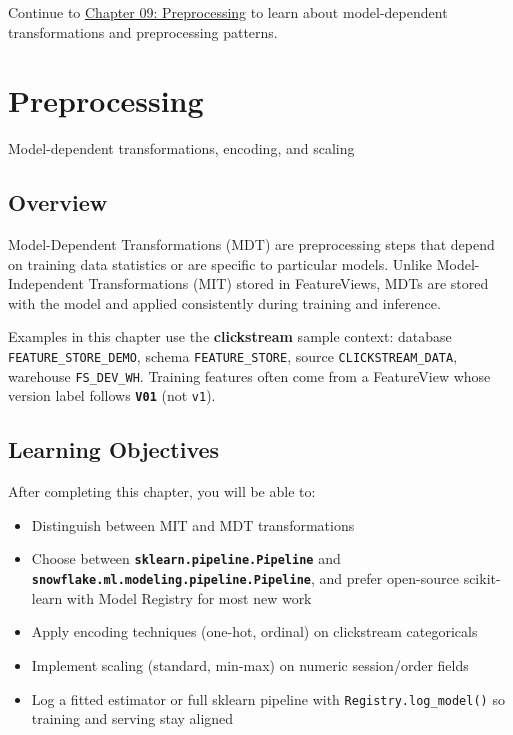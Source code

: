\documentclass[
  letterpaper,
  DIV=11,
  numbers=noendperiod]{scrreprt}
\providecommand{\tightlist}{%
  \setlength{\itemsep}{0pt}\setlength{\parskip}{0pt}}\usepackage{longtable,booktabs,array}
\begin{document}
Continue to \protect\hyperlink{preprocessing}{Chapter 09: Preprocessing}
to learn about model-dependent transformations and preprocessing
patterns.

\hypertarget{preprocessing}{%
\chapter{Preprocessing}\label{preprocessing}}

Model-dependent transformations, encoding, and scaling

\hfill\break

\hypertarget{overview-9}{%
\section{Overview}\label{overview-9}}

Model-Dependent Transformations (MDT) are preprocessing steps that
depend on training data statistics or are specific to particular models.
Unlike Model-Independent Transformations (MIT) stored in FeatureViews,
MDTs are stored with the model and applied consistently during training
and inference.

Examples in this chapter use the \textbf{clickstream} sample context:
database \texttt{FEATURE\_STORE\_DEMO}, schema \texttt{FEATURE\_STORE},
source \texttt{CLICKSTREAM\_DATA}, warehouse \texttt{FS\_DEV\_WH}.
Training features often come from a FeatureView whose version label
follows \textbf{\texttt{V01}} (not \texttt{v1}).

\hypertarget{learning-objectives-8}{%
\section{Learning Objectives}\label{learning-objectives-8}}

After completing this chapter, you will be able to:

\begin{itemize}
\tightlist
\item
  Distinguish between MIT and MDT transformations
\item
  Choose between \textbf{\texttt{sklearn.pipeline.Pipeline}} and
  \textbf{\texttt{snowflake.ml.modeling.pipeline.Pipeline}}, and prefer
  open-source scikit-learn with Model Registry for most new work
\item
  Apply encoding techniques (one-hot, ordinal) on clickstream
  categoricals
\item
  Implement scaling (standard, min-max) on numeric session/order fields
\item
  Log a fitted estimator or full sklearn pipeline with
  \texttt{Registry.log\_model()} so training and serving stay aligned
\end{itemize}
\end{document}
